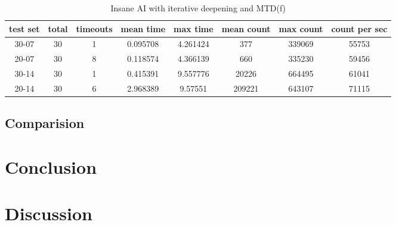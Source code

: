 \documentclass[a4paper]{article}
\begin{document}
\begin{table}[h]
	\centering
	\begin{adjustbox}{center}
	\begin{tabular}{|c|c|c|c|c|c|c|c|}\hline
	\textbf{test set} & \textbf{total} & \textbf{timeouts} & \textbf{mean time} & \textbf{max time} & \textbf{mean count} & \textbf{max count} & \textbf{count per sec} \\\hline
	30-07 & 30 & 1 & 0.095708 & 4.261424 & 377 & 339069 & 55753 \\\hline
	20-07 & 30 & 8 & 0.118574 & 4.366139 & 660 & 335230 & 59456 \\\hline
	30-14 & 30 & 1 & 0.415391 & 9.557776 & 20226 & 664495 & 61041 \\\hline
	20-14 & 30 & 6 & 2.968389 & 9.57551 & 209221 & 643107 & 71115 \\\hline
	\end{tabular}
	\end{adjustbox}
	\caption{Insane AI with iterative deepening and MTD(f)}
	\label{tab: }
\end{table}

\subsection{Comparision}

\section{Conclusion}

\section{Discussion}



\end{document}
